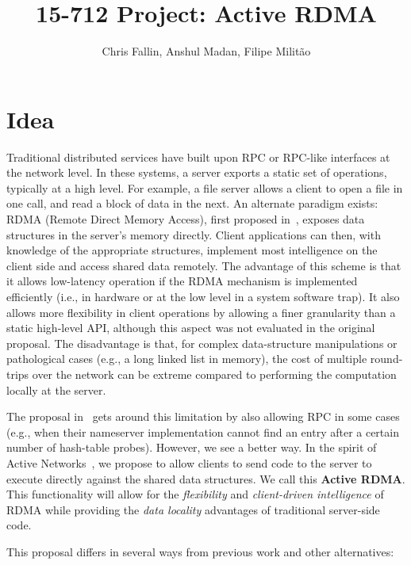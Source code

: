 \documentclass[10pt]{article}
\title{15-712 Project: Active RDMA}
\author{Chris Fallin, Anshul Madan, Filipe Milit\~{a}o}
\date{}
\begin{document}
\maketitle

\section{Idea}

Traditional distributed services have built upon RPC or RPC-like
interfaces at the network level. In these systems, a server exports a
static set of operations, typically at a high level. For example, a
file server allows a client to open a file in one call, and read a
block of data in the next. An alternate paradigm exists: RDMA (Remote
Direct Memory Access), first proposed in~\cite{thekkath94}, exposes
data structures in the server's memory directly. Client applications
can then, with knowledge of the appropriate structures, implement most
intelligence on the client side and access shared data remotely. The
advantage of this scheme is that it allows low-latency operation if
the RDMA mechanism is implemented efficiently (i.e., in hardware or at
the low level in a system software trap). It also allows more
flexibility in client operations by allowing a finer granularity than
a static high-level API, although this aspect was not evaluated in the
original proposal. The disadvantage is that, for complex
data-structure manipulations or pathological cases (e.g., a long
linked list in memory), the cost of multiple round-trips over the
network can be extreme compared to performing the computation locally
at the server.

The proposal in~\cite{thekkath94} gets around this limitation by also
allowing RPC in some cases (e.g., when their nameserver implementation
cannot find an entry after a certain number of hash-table
probes). However, we see a better way. In the spirit of Active
Networks~\cite{AN-survey}, we propose to allow clients to send code to
the server to execute directly against the shared data structures. We
call this \textbf{Active RDMA}. This functionality will allow for the
\emph{flexibility} and \emph{client-driven intelligence} of RDMA while
providing the \emph{data locality} advantages of traditional
server-side code.

This proposal differs in several ways from previous work and other
alternatives:
\end{document}
